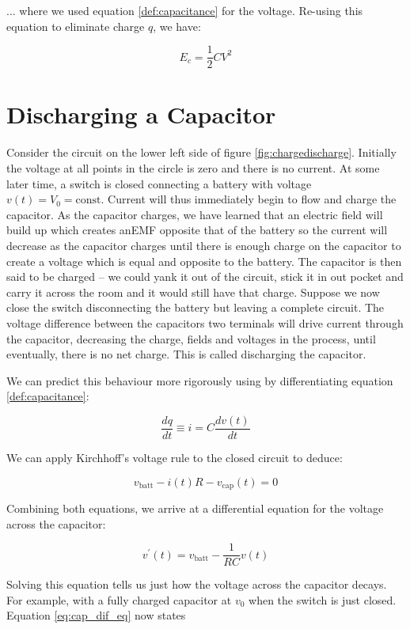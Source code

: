 \documentclass{tufte-book}
\begin{document}
\noindent ... where we used equation \ref{def:capacitance} for the voltage. Re-using this equation to eliminate charge $q$, we have:

\begin{equation}\label{eq:energy_capacitor}
E_c=\frac{1}{2}CV^2
\end{equation}

\section{Discharging a Capacitor}

Consider the circuit on the lower left side of figure \ref{fig:chargedischarge}. Initially the voltage at all points in the circle is zero and there is no current. At some later time, a switch is closed connecting a battery with voltage $v(t) = V_0 =  \text{const}$. Current will thus immediately begin to flow and charge the capacitor. As the capacitor charges, we have learned that an electric field will build up which creates anEMF opposite that of the battery so the current will decrease as the capacitor charges until there is enough charge on the capacitor to create a voltage which is equal and opposite to the battery. The capacitor is then said to be charged -- we could yank it out of the circuit, stick it in out pocket and carry it across the room and it would still have that charge. Suppose we now close the switch disconnecting the battery but leaving a complete circuit. The voltage difference between the capacitors two terminals will drive current through the capacitor, decreasing the charge, fields and voltages in the process, until eventually, there is no net charge. This is called discharging the capacitor.

We can predict this behaviour more rigorously using by differentiating equation \ref{def:capacitance}:

$$
\frac{dq}{dt} \equiv i = C\frac{dv(t)}{dt}
$$

\noindent We can apply Kirchhoff's voltage rule to the closed circuit to deduce:

$$
v_{\text{batt}} -i(t)R - v_{\text{cap}}(t) = 0
$$

Combining both equations, we arrive at a differential equation for the voltage across the capacitor:


\begin{equation}\label{eq:cap_dif_eq}
v^\prime(t) =v_{\text{batt}} -\frac{1}{RC}v(t)
\end{equation}

Solving this equation tells us just how the voltage across the capacitor decays. For example, with a fully charged capacitor at $v_0$ when the switch is just closed. Equation \ref{eq:cap_dif_eq} now states
\end{document}

